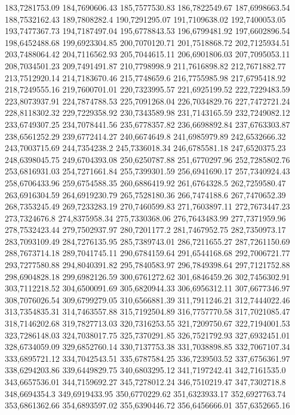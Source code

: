 183,7281753.09
184,7690606.43
185,7577530.83
186,7822549.67
187,6998663.54
188,7532162.43
189,7808282.4
190,7291295.07
191,7109638.02
192,7400053.05
193,7477367.73
194,7187497.04
195,6778843.53
196,6799481.92
197,6602896.54
198,6452488.68
199,6923304.85
200,7070120.71
201,7518868.72
202,7125934.51
203,7488064.42
204,7116562.93
205,7044615.11
206,6901806.03
207,7095053.11
208,7034501.23
209,7491491.87
210,7798998.9
211,7616898.82
212,7671882.77
213,7512920.14
214,7183670.46
215,7748659.6
216,7755985.98
217,6795418.92
218,7249555.16
219,7600701.01
220,7323995.57
221,6925199.52
222,7229483.59
223,8073937.91
224,7874788.53
225,7091268.04
226,7034829.76
227,7472721.24
228,8118302.32
229,7229358.92
230,7343589.98
231,7143165.59
232,7249082.12
233,6749307.25
234,7078441.56
235,6778357.82
236,6698892.84
237,6763303.87
238,6561252.29
239,6772414.27
240,6674649.8
241,6985979.89
242,6532666.32
243,7003715.69
244,7354238.2
245,7336018.34
246,6785581.18
247,6520375.23
248,6398045.75
249,6704393.08
250,6250787.88
251,6770297.96
252,7285802.76
253,6816931.03
254,7271661.84
255,7399301.59
256,6941690.17
257,7340924.43
258,6706433.96
259,6754588.35
260,6886419.92
261,6764328.5
262,7259580.47
263,6916304.59
264,6919230.79
265,7528180.36
266,7474188.6
267,7470652.39
268,7353245.49
269,7233283.19
270,7460599.83
271,7603897.11
272,7673447.23
273,7324676.8
274,8375958.34
275,7330368.06
276,7643483.99
277,7371959.96
278,7532423.44
279,7502937.97
280,7201177.2
281,7467952.75
282,7350973.17
283,7093109.49
284,7276135.95
285,7389743.01
286,7211655.27
287,7261150.69
288,7673714.18
289,7041745.11
290,6784159.64
291,6544168.68
292,7006721.77
293,7277580.88
294,8040391.82
295,7840583.97
296,7849398.64
297,7121752.88
298,6904828.18
299,6982126.59
300,6761272.62
301,6846459.26
302,7456302.91
303,7112218.52
304,6500091.69
305,6820944.33
306,6956312.11
307,6677346.97
308,7076026.54
309,6799279.05
310,6566881.39
311,7911246.21
312,7444022.46
313,7354835.31
314,7463557.88
315,7192504.89
316,7757770.58
317,7021085.47
318,7146202.68
319,7827713.03
320,7316253.55
321,7209750.67
322,7194001.53
323,7286148.03
324,7038017.75
325,7370291.85
326,7521792.93
327,6932451.01
328,6734059.09
329,6852760.14
330,7137753.38
331,7038898.85
332,7067107.34
333,6895721.12
334,7042543.51
335,6787584.25
336,7239503.52
337,6756361.97
338,6294203.86
339,6449829.75
340,6803295.12
341,7197242.41
342,7161535.0
343,6657536.01
344,7159692.27
345,7278012.24
346,7510219.47
347,7302718.8
348,6694354.3
349,6919433.95
350,6770229.62
351,6323933.17
352,6927763.74
353,6861362.66
354,6893597.02
355,6390446.72
356,6456666.01
357,6352665.16
